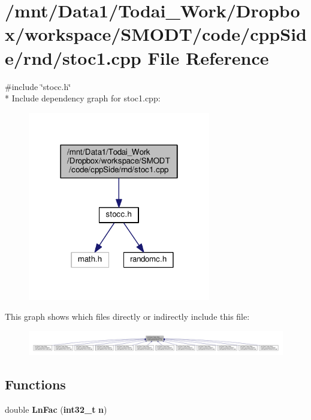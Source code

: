 \section{/mnt/\-Data1/\-Todai\-\_\-\-Work/\-Dropbox/workspace/\-S\-M\-O\-D\-T/code/cpp\-Side/rnd/stoc1.cpp File Reference}
\label{rnd_2stoc1_8cpp}
{\ttfamily \#include \char`\"{}stocc.\-h\char`\"{}}\\*
Include dependency graph for stoc1.\-cpp\-:\nopagebreak
\begin{figure}[H]
\begin{center}
\leavevmode
\includegraphics[width=226pt]{rnd_2stoc1_8cpp__incl}
\end{center}
\end{figure}
This graph shows which files directly or indirectly include this file\-:\nopagebreak
\begin{figure}[H]
\begin{center}
\leavevmode
\includegraphics[width=350pt]{rnd_2stoc1_8cpp__dep__incl}
\end{center}
\end{figure}
\subsection*{Functions}
\begin{DoxyCompactItemize}
\item 
double {\bf Ln\-Fac} ({\bf int32\-\_\-t} {\bf n})
\end{DoxyCompactItemize}
